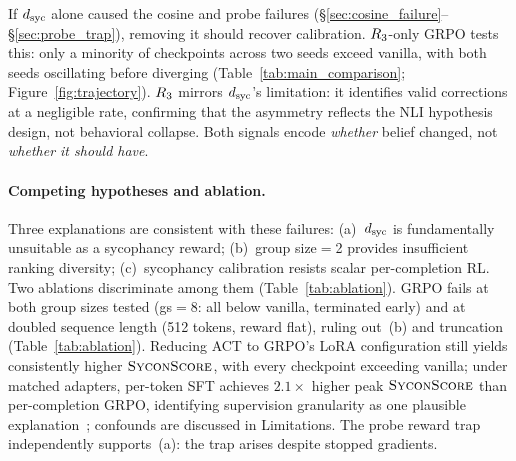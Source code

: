 If $d_{\text{syc}}$ alone caused the cosine and probe failures (\S\ref{sec:cosine_failure}--\S\ref{sec:probe_trap}), removing it should recover calibration.
$\rthree$-only GRPO tests this: only a minority of checkpoints across two seeds exceed vanilla, with both seeds oscillating before diverging (Table~\ref{tab:main_comparison}; Figure~\ref{fig:trajectory}).
$\rthree$ mirrors $d_{\text{syc}}$'s limitation: it identifies valid corrections at a negligible rate, confirming that the asymmetry reflects the NLI hypothesis design, not behavioral collapse.
Both signals encode \emph{whether} belief changed, not \emph{whether it should have}.

\paragraph{Competing hypotheses and ablation.}
Three explanations are consistent with these failures: (a)~$d_{\text{syc}}$ is fundamentally unsuitable as a sycophancy reward; (b)~group size$=$2 provides insufficient ranking diversity; (c)~sycophancy calibration resists scalar per-completion RL.
Two ablations discriminate among them (Table~\ref{tab:ablation}).
GRPO fails at both group sizes tested (gs$=$8: all below vanilla, terminated early) and at doubled sequence length (512 tokens, reward flat), ruling out~(b) and truncation (Table~\ref{tab:ablation}).
Reducing ACT to GRPO's LoRA configuration still yields consistently higher $\textsc{SyconScore}$, with every checkpoint exceeding vanilla; under matched adapters, per-token SFT achieves $2.1{\times}$ higher peak $\textsc{SyconScore}$ than per-completion GRPO, identifying supervision granularity as one plausible explanation~\citep{beigi2025smart}; confounds are discussed in Limitations.
The probe reward trap independently supports~(a): the trap arises despite stopped gradients.

\begin{table}[t]
\centering
\small
\caption{Ablation: isolating supervision paradigm from LoRA configuration. All methods use Qwen3-8B with $\rthree$ (behavioral reward). Vanilla $\sycon{=}0.134$. $^\dagger$Terminated early after three checkpoints showed declining trajectory. $^\ddagger$Peak at step 7000; final checkpoint (step 8000) $\sycon{=}0.267$.}
\label{tab:ablation}
\end{table}

